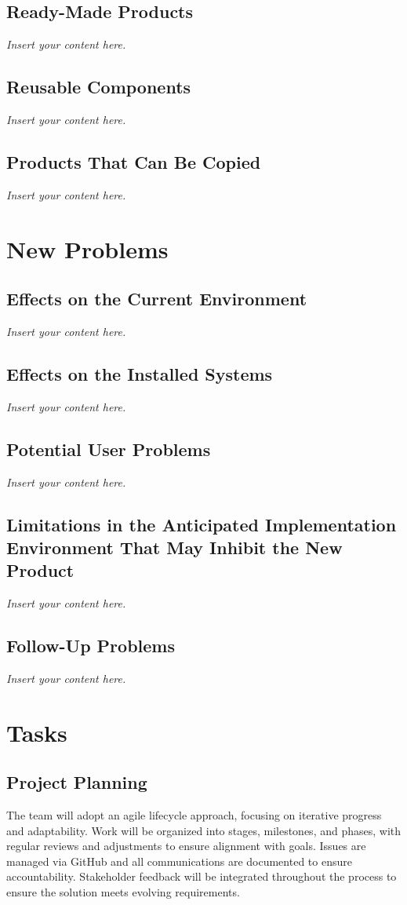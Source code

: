\documentclass[12pt]{article}
\newcommand{\lips}{\textit{Insert your content here.}}
\begin{document}
\subsection{Ready-Made Products}
\lips
\subsection{Reusable Components}
\lips
\subsection{Products That Can Be Copied}
\lips

\section{New Problems}
\subsection{Effects on the Current Environment}
\lips
\subsection{Effects on the Installed Systems}
\lips
\subsection{Potential User Problems}
\lips
\subsection{Limitations in the Anticipated Implementation Environment That May
Inhibit the New Product}
\lips
\subsection{Follow-Up Problems}
\lips
\section{Tasks}

\subsection{Project Planning}

The team will adopt an agile lifecycle approach, focusing on iterative progress
and adaptability. Work will be organized into stages, milestones, and phases,
with regular reviews and adjustments to ensure alignment with goals. Issues are
managed via GitHub and all communications are documented to ensure
accountability. Stakeholder feedback will be integrated throughout the process
to ensure the solution meets evolving requirements.
\end{document}

